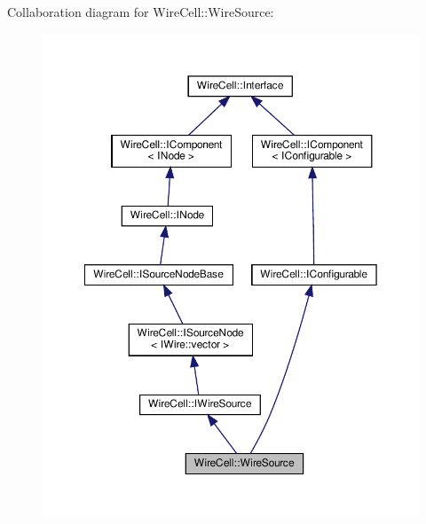 Collaboration diagram for Wire\+Cell\+:\+:Wire\+Source\+:
\nopagebreak
\begin{figure}[H]
\begin{center}
\leavevmode
\includegraphics[width=350pt]{class_wire_cell_1_1_wire_source__coll__graph}
\end{center}
\end{figure}
